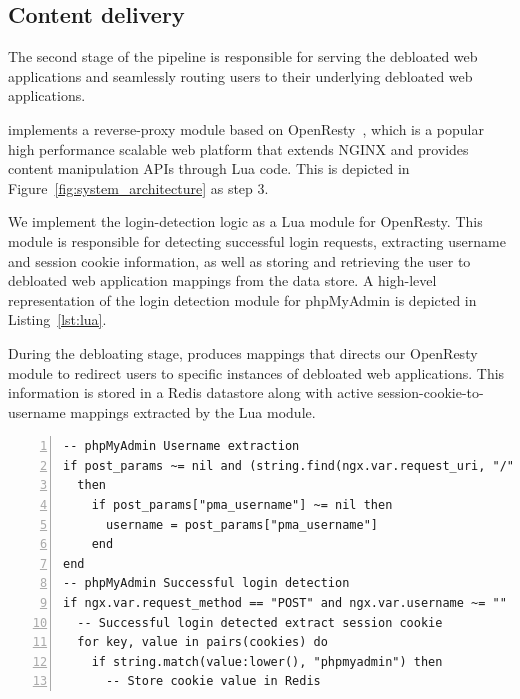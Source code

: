 \subsection{Content delivery}

The second stage of the \dbltr{} pipeline is responsible for serving the debloated web applications and seamlessly routing users to their underlying debloated web applications. 

\dbltr{} implements a reverse-proxy module based on OpenResty~\cite{openresty}, which is a popular high performance scalable web platform that extends NGINX and provides content manipulation APIs through Lua code. 
This is depicted in Figure~\ref{fig:system_architecture} as step 3. 

We implement the login-detection logic as a Lua module for OpenResty. 
This module is responsible for detecting successful login requests, extracting username and session cookie information, as well as storing and retrieving the user to debloated web application mappings from the data store. 
A high-level representation of the login detection module for phpMyAdmin is depicted in Listing~\ref{lst:lua}.

During the debloating stage, \dbltr{} produces mappings that directs our OpenResty module to redirect users to specific instances of debloated web applications. 
This information is stored in a Redis datastore along with active session-cookie-to-username mappings extracted by the Lua module. 

\begin{lstlisting}[caption=LUA configuration to detect successful logins and extract authentication cookies for phpMyAdmin,label=lst:lua,basicstyle=\footnotesize, float=tp, floatplacement=tbp, language={[5.0]Lua},commentstyle=\color{commentsColor}\textit, numbers=left, xleftmargin=5.0ex, breaklines=true]
-- phpMyAdmin Username extraction
if post_params ~= nil and (string.find(ngx.var.request_uri, "/") or string.find(ngx.var.request_uri, "index.php")) 
  then
    if post_params["pma_username"] ~= nil then
      username = post_params["pma_username"]
    end
end
-- phpMyAdmin Successful login detection
if ngx.var.request_method == "POST" and ngx.var.username ~= "" and ngx.status == 302 then
  -- Successful login detected extract session cookie
  for key, value in pairs(cookies) do
    if string.match(value:lower(), "phpmyadmin") then
      -- Store cookie value in Redis
\end{lstlisting}

